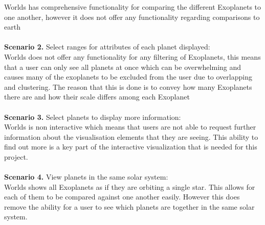 Worlds has comprehensive functionality for comparing the different Exoplanets to
one another, however it does not offer any functionality regarding comparisons
to earth 
\\\\
{\bf Scenario 2.} Select ranges for attributes of each planet displayed:\\
Worlds does not offer any functionality for any filtering of Exoplanets, this
means that a user can only see all planets at once which can be overwhelming and
causes many of the exoplanets to be excluded from the user due to overlapping
and clustering. The reason that this is done is to convey how many Exoplanets
there are and how their scale differs among each Exoplanet
\\\\
{\bf Scenario 3.} Select planets to display more information:\\
Worlds is non interactive which means that users are not able to request further
information about the visualisation elements that they are seeing. This ability
to find out more is a key part of the interactive visualization that is needed
for this project.
\\\\
{\bf Scenario 4.} View planets in the same solar system:\\
Worlds shows all Exoplanets as if they are orbiting a single star. This allows
for each of them to be compared against one another easily. However this does
remove the ability for a user to see which planets are together in the same
solar system.


